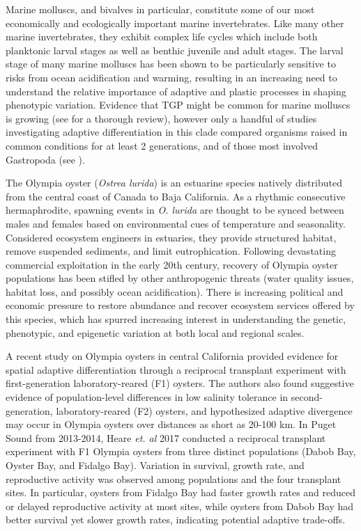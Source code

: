 \documentclass[fleqn,10pt]{wlscirep}
\begin{document}
Marine molluscs, and bivalves in particular, constitute some of our most economically and ecologically important marine invertebrates. Like many other marine invertebrates, they exhibit complex life cycles which include both planktonic larval stages as well as benthic juvenile and adult stages. The larval stage of many marine molluscs has been shown to be particularly sensitive to risks from ocean acidification and warming\cite{Parker2013-xg,Byrne2011-hk}, resulting in an increasing need to understand the relative importance of adaptive and plastic processes in shaping phenotypic variation. Evidence that TGP might be common for marine molluscs is growing (see \cite{Ross2016-en} for a thorough review), however only a handful of studies investigating adaptive differentiation in this clade compared organisms raised in common conditions for at least 2 generations, and of those most involved Gastropoda (see \cite{Kuo2009-co,Palmer1994-nw,Sanford2010-df,Dittman1998-xm,Bible2016-rb}).\par 
The Olympia oyster (\textit{Ostrea lurida}) is an estuarine species natively distributed from the central coast of Canada to Baja California. As a rhythmic consecutive hermaphrodite, spawning events in \textit{O. lurida} are thought to be synced between males and females based on environmental cues of temperature and seasonality\cite{Coe1932-nq}. Considered ecosystem engineers in estuaries, they provide structured habitat, remove suspended sediments, and limit eutrophication\cite{Ruesink2005-lt}. Following devastating commercial exploitation in the early 20th century, recovery of Olympia oyster populations has been stifled by other anthropogenic threats (water quality issues, habitat loss, and possibly ocean acidification)\cite{Blake2012-ln,Hettinger2013-od}. There is increasing political and economic pressure to restore abundance and recover ecosystem services offered by this species, which has spurred increasing interest in understanding the genetic, phenotypic, and epigenetic variation at both local and regional scales\cite{Camara2009-sn}.\par 
A recent study on Olympia oysters in central California provided evidence for spatial adaptive differentiation through a reciprocal transplant experiment with first-generation laboratory-reared (F1) oysters. The authors also found suggestive evidence of population-level differences in low salinity tolerance in second-generation, laboratory-reared (F2) oysters, and hypothesized adaptive divergence may occur in Olympia oysters over distances as short as 20-100 km\cite{Bible2016-rb}. In Puget Sound from 2013-2014, Heare \textit{et. al} 2017\cite{Heare2017-uv} conducted a reciprocal transplant experiment with F1 Olympia oysters from three distinct populations (Dabob Bay, Oyster Bay, and Fidalgo Bay). Variation in survival, growth rate, and reproductive activity was observed among populations and the four transplant sites. In particular, oysters from Fidalgo Bay had faster growth rates and reduced or delayed reproductive activity at most sites, while oysters from Dabob Bay had better survival yet slower growth rates, indicating potential adaptive trade-offs\cite{Heare2017-uv}.\par 
\end{document}
